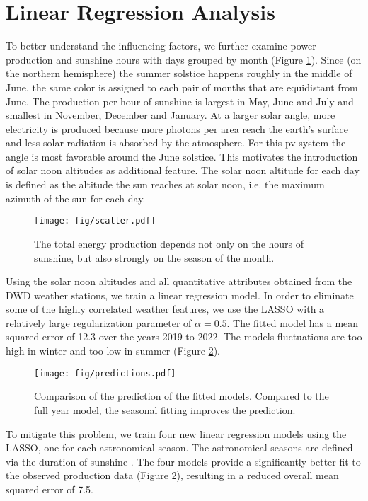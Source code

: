 \documentclass{article}
\begin{document}
\section{Linear Regression Analysis}
To better understand the influencing factors, we further examine power production and sunshine hours with days grouped by month (Figure \ref{fig:scatter_months}). Since (on the northern hemisphere) the summer solstice happens roughly in the middle of June, the same color is assigned to each pair of months that are equidistant from June. The production per hour of sunshine is largest in May, June and July and smallest in November, December and January. At a larger solar angle, more electricity is produced because more photons per area reach the earth's surface and less solar radiation is absorbed by the atmosphere. For this pv system the angle is most favorable around the June solstice. This motivates the introduction of solar noon altitudes as additional feature. The solar noon altitude for each day is defined as the altitude the sun reaches at solar noon, i.e. the maximum azimuth of the sun for each day. 

\begin{figure}[H]
	\texttt{[image: fig/scatter.pdf]}
	\caption{The total energy production depends not only on the hours of sunshine, but also strongly on the season of the month.}\label{fig:scatter_months}
\end{figure}

Using the solar noon altitudes and all quantitative attributes obtained from the DWD weather stations, we train a linear regression model. In order to eliminate some of the highly correlated weather features, we use the LASSO with a relatively large regularization parameter of $\alpha = 0.5$. The fitted model has a mean squared error of 12.3 over the years 2019 to 2022. The models fluctuations are too high in winter and too low in summer (Figure \ref{fig:predictions}).

\begin{figure}[H]
	\texttt{[image: fig/predictions.pdf]}
	\caption{Comparison of the prediction of the fitted models. Compared to the full year model, the seasonal fitting improves the prediction.}\label{fig:predictions}
\end{figure}

To mitigate this problem, we train four new linear regression models using the LASSO, one for each astronomical season. The astronomical seasons are defined via the duration of sunshine \cite{MS}. The four models provide a significantly better fit to the observed production data (Figure \ref{fig:predictions}), resulting in a reduced overall mean squared error of 7.5.
\end{document}

